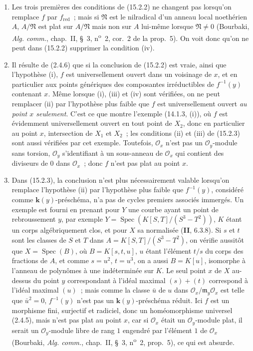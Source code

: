 \begin{remarks}[15.2.4]
\label{IV.15.2.4-fr}
\begin{enumerate}[label=(\roman*)]
  \item Les trois premières des conditions de (15.2.2) ne changent pas lorsqu'on
  remplace $f$ par $f_{\mathrm{red}}$~; mais si $\mathfrak N$ est le nilradical
  d'un anneau local noethérien $A$, $A/\mathfrak N$ est plat sur $A/\mathfrak N$
  mais non sur $A$ lui-même lorsque $\mathfrak N\ne0$ (Bourbaki,
  \emph{Alg. comm.}, chap.~II, \S~3, n\textsuperscript{o}~2, cor.~2 de la
  prop.~5). On voit donc qu'on ne peut dans (15.2.2) supprimer la condition (iv).

  \item Il résulte de (2.4.6) que si la conclusion de (15.2.2) est vraie, ainsi
  que l'hypothèse (i), $f$ est universellement ouvert dans un voisinage de $x$,
  et en particulier aux points génériques des composantes irréductibles de
  $f^{-1}(y)$ contenant $x$. Même lorsque (i), (iii) et (iv) sont vérifiées, on
  ne peut remplacer (ii) par l'hypothèse plus faible que $f$ est universellement
  ouvert \emph{au point $x$ seulement}. C'est ce que montre l'exemple
  (14.1.3, (i)), où $f$ est évidemment universellement ouvert en tout point de
  $X_2$, donc en particulier au point $x$, intersection de $X_1$ et $X_2$~; les
  conditions (ii) et (iii) de (15.2.3) sont aussi vérifiées par cet exemple.
  Toutefois, $\mathcal O_x$ n'est pas un $\mathcal O_y$-module sans torsion,
  $\mathcal O_y$ s'identifiant à un sous-anneau de $\mathcal O_x$ qui contient
  des diviseurs de $0$ dans $\mathcal O_x$~; donc $f$ n'est pas plat au point $x$.

  \item Dans (15.2.3), la conclusion n'est plus nécessairement valable lorsqu'on
  remplace l'hypothèse (ii) par l'hypothèse plus faible que $f^{-1}(y)$,
  considéré comme $\mathbf{k}(y)$-préschéma, n'a pas de cycles premiers associés
  immergés. Un exemple est fourni en prenant pour $Y$ une courbe ayant un point
  de rebroussement $y$, par exemple
  $Y=\operatorname{Spec}(K[S,T]/(S^3-T^2))$, $K$ étant un corps algébriquement
  clos, et pour $X$ sa normalisée (\textbf{II}, 6.3.8). Si $s$ et $t$ sont les
  classes de $S$ et $T$ dans $A=K[S,T]/(S^3-T^2)$, on vérifie aussitôt que
  $X=\operatorname{Spec}(B)$, où $B=K[s,t,u]$, $u$ étant l'élément $t/s$ du corps
  des fractions de $A$, et comme $s=u^2$, $t=u^3$, on a aussi $B=K[u]$,
  isomorphe à l'anneau de polynômes à une indéterminée sur $K$. Le seul point $x$
  de $X$ au-dessus du point $y$ correspondant à l'idéal maximal $(s)+(t)$
  correspond à l'idéal maximal $(u)$~; mais comme la classe $\bar u$ de $u$ dans
  $\mathcal O_x/\mathfrak m_y\mathcal O_x$ est telle que $\bar u^2=0$,
  $f^{-1}(y)$ n'est pas un $\mathbf{k}(y)$-préschéma réduit. Ici $f$ est un
  morphisme fini, surjectif et radiciel, donc un homéomorphisme universel (2.4.5),
  mais n'est pas plat au point $x$, car si $\mathcal O_x$ était un
  $\mathcal O_y$-module plat, il serait un $\mathcal O_y$-module
  libre de rang $1$ engendré par l'élément $1$ de $\mathcal O_x$ (Bourbaki,
  \emph{Alg. comm.}, chap.~II, \S~3, n\textsuperscript{o}~2, prop.~5), ce qui est
  absurde.


\end{enumerate}
\end{remarks}
